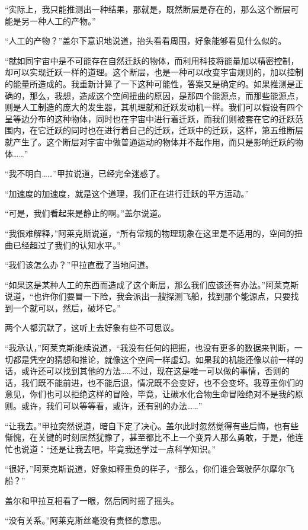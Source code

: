 “实际上，我只能推测出一种结果，那就是，既然断层是存在的，那么这个断层可能是另一种人工的产物。” 

“人工的产物？”盖尔下意识地说道，抬头看看周围，好象能够看见什么似的。 

“就如同宇宙中是不可能存在自然迁跃的物体，而利用科技将能量加以精密控制，却可以实现迁跃一样的道理。这个断层，也是一种可以改变宇宙规则的，加以控制的能量所造成的。我重新计算了一下这种可能性，答案又是确定的。如果推测是正确的，那么，我想，造成这个空间扭曲的原因，是那四个能源点，而那些能源点，则是人工制造的庞大的发生器，其机理就和迁跃发动机一样。我们可以假设有四个呈等边分布的这种物体，同时也在宇宙中进行着迁跃，而我们则被套在它的迁跃范围内，在它迁跃的同时也在进行着自己的迁跃，迁跃中的迁跃，这样，第五维断层就产生了。这个断层对宇宙中做普通运动的物体并不起作用，而只是影响迁跃的物体……” 

“我不明白……”甲拉说道，已经完全迷惑了。 

“加速度的加速度，就是这个道理，我们正在进行迁跃的平方运动。” 

“可是，我们看起来是静止的啊。”盖尔说道。 

“我很难解释，”阿莱克斯说道，“所有常规的物理现象在这里是不适用的，空间的扭曲已经超过了我们的认知水平。” 

“我们该怎么办？”甲拉直截了当地问道。 

“如果这是某种人工的东西而造成了这个断层，那么我们应该还有办法。”阿莱克斯说道，“也许你们要冒一下险，我会派出一艘探测飞船，找到那个能源点，只要找到一个就可以，然后，破坏它。” 

两个人都沉默了，这听上去好象有些不可思议。 

“我承认，”阿莱克斯继续说道，“我没有任何的把握，也没有更多的数据来判断，一切都是凭空的猜想和推论，就像这个空间一样虚幻。如果我的机能还像以前一样的话，或许还可以找到其他的方法……不过，现在这是唯一可以做的事情，否则的话，我们既不能前进，也不能后退，情况既不会变好，也不会变坏。我尊重你们的意见，你们也可以拒绝这样的冒险，毕竟，让碳水化合物生命冒险绝对不是我的原则。或许，我们可以等等看，或许，还有别的办法……” 

“让我去。”甲拉突然说道，暗自下定了决心。盖尔此时忽然觉得有些后悔，也有些惭愧，在关键的时刻居然犹豫了，甚至都比不上一个变异人那么勇敢，于是，他连忙也说道：“还是让我去吧，毕竟我还学过一点科学知识。” 

“很好，”阿莱克斯说道，好象如释重负的样子，“那么，你们谁会驾驶萨尔摩尔飞船？” 

盖尔和甲拉互相看了一眼，然后同时摇了摇头。 

“没有关系。”阿莱克斯丝毫没有责怪的意思。 

